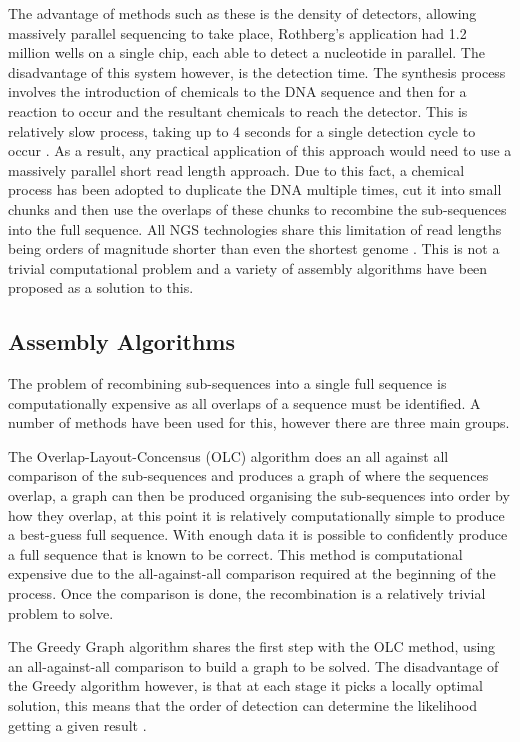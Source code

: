 The advantage of methods such as these is the density of detectors, allowing massively parallel sequencing to take place, Rothberg's application had 1.2 million wells on a single chip, each able to detect a nucleotide in parallel. The disadvantage of this system however, is the detection time. The synthesis process involves the introduction of chemicals to the DNA sequence and then for a reaction to occur and the resultant chemicals to reach the detector. This is relatively slow process, taking up to 4 seconds for a single detection cycle to occur \cite{rothberg2011integrated}. As a result, any practical application of this approach would need to use a massively parallel short read length approach. Due to this fact, a chemical process has been adopted to duplicate the DNA multiple times, cut it into small chunks and then use the overlaps of these chunks to recombine the sub-sequences into the full sequence. All NGS technologies share this limitation of read lengths being orders of magnitude shorter than even the shortest genome \cite{miller2010assembly}. This is not a trivial computational problem and a variety of assembly algorithms have been proposed as a solution to this. 


\subsection{Assembly Algorithms}

The problem of recombining sub-sequences into a single full sequence is computationally expensive as all overlaps of a sequence must be identified. A number of methods have been used for this, however there are three main groups. 


The Overlap-Layout-Concensus (OLC) algorithm does an all against all comparison of the sub-sequences and produces a graph of where the sequences overlap, a graph can then be produced organising the sub-sequences into order by how they overlap, at this point it is relatively computationally simple to produce a best-guess full sequence. With enough data it is possible to confidently produce a full sequence that is known to be correct. This method is computational expensive due to the all-against-all comparison required at the beginning of the process. Once the comparison is done, the recombination is a relatively trivial problem to solve. 



The Greedy Graph algorithm shares the first step with the OLC method, using an all-against-all comparison to build a graph to be solved. The disadvantage of the Greedy algorithm however, is that at each stage it picks a locally optimal solution, this means that the order of detection can determine the likelihood getting a given result \cite{hu2012cmos}. 



